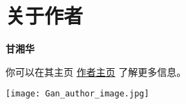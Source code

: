 
\chapter{关于作者}
\label{ch:Author}

\begin{minipage}{0.7\linewidth}
\textbf{甘湘华}

你可以在其主页 \href{http://sierxue.me/about}{作者主页} 了解更多信息。
\end{minipage}
\hfill
\begin{minipage}{0.25\linewidth}
\texttt{[image: Gan\_author\_image.jpg]}  
\end{minipage}
